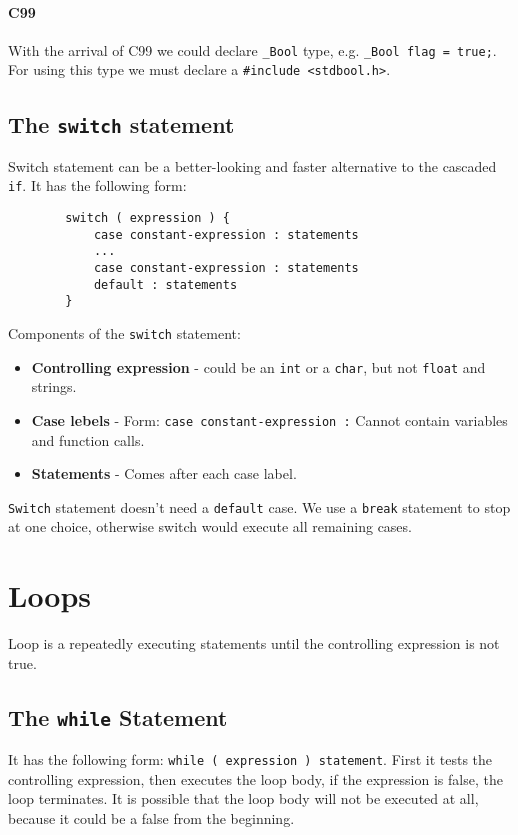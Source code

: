 \documentclass[12pt, openany]{book}
\begin{document}
    \subsubsection*{C99}
    With the arrival of C99 we could declare \texttt{\_Bool} type, e.g.
    \texttt{\_Bool flag = true;}. For using this type we must declare a
    \texttt{\#include <stdbool.h>}.
    
    \section{The \texttt{switch} statement}
    Switch statement can be a better-looking and faster alternative to the cascaded
    \texttt{if}. It has the following form:
    \begin{lstlisting}
        switch ( expression ) {
            case constant-expression : statements
            ...
            case constant-expression : statements
            default : statements
        }
    \end{lstlisting}
    
    Components of the \texttt{switch} statement:
    \begin{itemize}
        \item \textbf{Controlling expression} - could be an \texttt{int} or a
        \texttt{char}, but not \texttt{float} and strings.
        \item \textbf{Case lebels} - Form: \texttt{case constant-expression :}
        Cannot contain variables and function calls.
        \item \textbf{Statements} - Comes after each case label.
    \end{itemize}
    \texttt{Switch} statement doesn't need a \texttt{default} case. We use a
    \texttt{break} statement to stop at one choice, otherwise switch would execute
    all remaining cases.

    \chapter{Loops}
    Loop is a repeatedly executing statements until the controlling expression
    is not true.
    
    \section{The \texttt{while} Statement}
    It has the following form: \texttt{while ( expression ) statement}. First
    it tests the controlling expression, then executes the loop body, if the
    expression is false, the loop terminates. It is possible that the loop
    body will not be executed at all, because it could be a false from the
    beginning.
    
\end{document}
